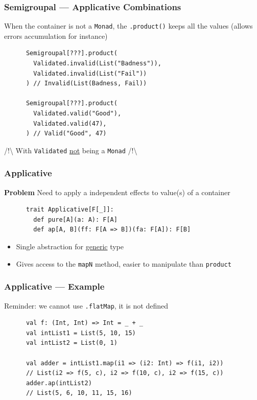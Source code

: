 \begin{frame}[fragile]
  \frametitle{Semigroupal --- Applicative Combinations}

  When the container is not a \texttt{Monad}, the \texttt{.product()} keeps all the values (allows errors accumulation for instance)
  \begin{example}
    \begin{lstlisting}
      Semigroupal[???].product(
        Validated.invalid(List("Badness")),
        Validated.invalid(List("Fail"))
      ) // Invalid(List(Badness, Fail))

      Semigroupal[???].product(
        Validated.valid("Good"),
        Validated.valid(47),
      ) // Valid("Good", 47)
    \end{lstlisting}
  \end{example}
  /!\textbackslash{} With \texttt{Validated} \ul{not} being a \texttt{Monad} /!\textbackslash{}
\end{frame}

\begin{frame}[fragile]
  \frametitle{Applicative}

  \textbf{Problem} Need to apply a independent effects to value(s) of a container

  \begin{definition}
    \begin{lstlisting}
      trait Applicative[F[_]]:
        def pure[A](a: A): F[A]
        def ap[A, B](ff: F[A => B])(fa: F[A]): F[B]
    \end{lstlisting}
  \end{definition}

  \begin{itemize}
    \item Single abstraction for \ul{generic} type
    \item Gives access to the \texttt{mapN} method, easier to manipulate than \texttt{product}
  \end{itemize}
\end{frame}

\begin{frame}[fragile]
  \frametitle{Applicative --- Example}

  Reminder: we cannot use \texttt{.flatMap}, it is not defined
  \begin{example}[Usage]
    \begin{lstlisting}
      val f: (Int, Int) => Int = _ + _
      val intList1 = List(5, 10, 15)
      val intList2 = List(0, 1)

      val adder = intList1.map(i1 => (i2: Int) => f(i1, i2))
      // List(i2 => f(5, c), i2 => f(10, c), i2 => f(15, c))
      adder.ap(intList2)
      // List(5, 6, 10, 11, 15, 16)
    \end{lstlisting}
  \end{example}
\end{frame}

